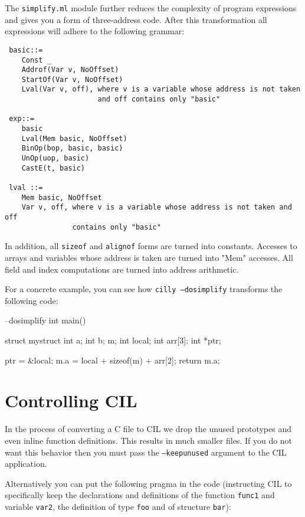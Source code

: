 \documentclass{article}
\def\t#1{{\tt #1}}
\begin{document}
The \t{simplify.ml} module further reduces the complexity of program
expressions and gives you a form of three-address code. After this
transformation all expressions will adhere to the following grammar: 
\begin{verbatim}
 basic::=
    Const _ 
    Addrof(Var v, NoOffset)
    StartOf(Var v, NoOffset)
    Lval(Var v, off), where v is a variable whose address is not taken
                      and off contains only "basic"

 exp::=
    basic
    Lval(Mem basic, NoOffset)
    BinOp(bop, basic, basic)
    UnOp(uop, basic)
    CastE(t, basic)
   
 lval ::= 
    Mem basic, NoOffset
    Var v, off, where v is a variable whose address is not taken and off
                contains only "basic"
\end{verbatim}
In addition, all \t{sizeof} and \t{alignof} forms are turned into
constants. Accesses to arrays and variables whose address is taken are
turned into "Mem" accesses. All field and index computations are turned
into address arithmetic.

For a concrete example, you can see how \t{cilly --dosimplify} 
transforms the following code:

\begin{cilcode}[global] --dosimplify
  int main() {
    struct mystruct {
      int a;
      int b;
    } m;
    int local;
    int arr[3];
    int *ptr;

    ptr = &local;
    m.a = local + sizeof(m) + arr[2];
    return m.a; 
  } 
\end{cilcode}

\section{Controlling CIL}

 In the process of converting a C file to CIL we drop the unused prototypes
and even inline function definitions. This results in much smaller files. If
you do not want this behavior then you must pass the \t{--keepunused} argument
to the CIL application. 

 Alternatively you can put the following pragma in the code (instructing CIL
to specifically keep the declarations and definitions of the function
\t{func1} and variable \t{var2}, the definition of type \t{foo} and of
structure \t{bar}):
\end{document}
